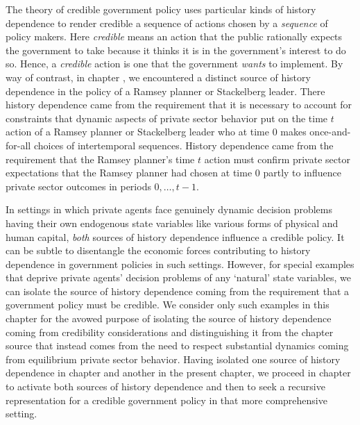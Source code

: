 The theory of credible government policy uses particular kinds of history dependence to render credible a  sequence of actions  chosen by  a {\it sequence\/}
of policy makers. Here {\it credible\/} means an action that the public rationally expects the government to take because it thinks it is in the government's interest  to do so.  Hence, a {\it credible\/}  action  is one that the  government  {\it wants\/} to implement.  By way of contrast, in chapter , we  encountered a distinct source of history dependence in the policy of a Ramsey planner or Stackelberg leader. There history dependence came from the requirement that it is necessary  to account for  constraints that dynamic aspects of  private sector behavior put on the time $t$ action of a Ramsey planner or Stackelberg leader who at time $0$  makes  once-and-for-all choices of intertemporal sequences.  History dependence came from the requirement that the Ramsey planner's time $t$ action  must confirm private sector expectations
 that the Ramsey planner had chosen  at  time $0$  partly  to influence private sector outcomes in periods $0, \ldots, t-1$.

In settings in which private agents face genuinely dynamic decision problems having their own endogenous state variables like various forms of physical and human capital, {\it both\/} sources of
history dependence influence a credible policy.  It can be subtle  to disentangle the economic forces contributing to history dependence in government
policies in such settings.     However, for  special  examples that  deprive private agents' decision problems of any `natural' state variables, we can isolate the source of history dependence coming from the requirement that a government policy  must be credible.  We consider only such examples  in this chapter
for the avowed purpose of isolating the source of history dependence coming from credibility considerations and distinguishing it from the
chapter 
source that instead comes  from the need to respect substantial  dynamics coming from equilibrium private sector behavior. Having isolated one source
of history dependence in chapter  and another in the present chapter, we proceed in chapter  to activate both
sources of history dependence and then to seek a recursive representation for a credible government policy in that more comprehensive setting.



